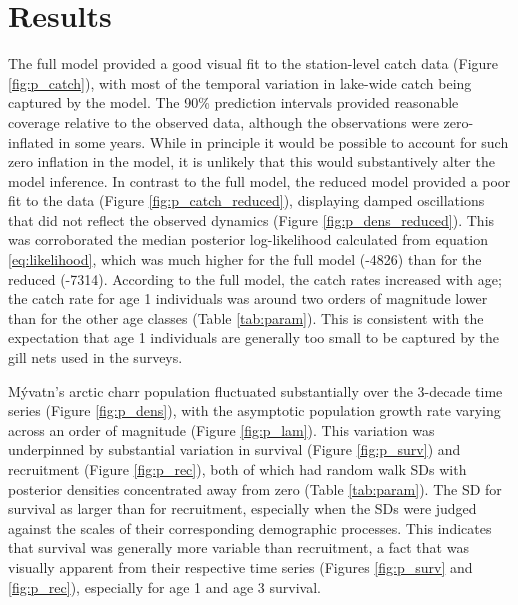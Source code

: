 \documentclass[11pt]{article}
\begin{document}
\section*{Results}

The full model provided a good visual fit to the station-level 
catch data (Figure \ref{fig:p_catch}),
with most of the temporal variation in lake-wide catch being captured by the model.
The 90\% prediction intervals provided reasonable coverage relative to the observed data,
although the observations were zero-inflated in some years.
While in principle it would be possible to account for such zero inflation in the model,
it is unlikely that this would substantively alter the model inference.
In contrast to the full model,
the reduced model provided a poor fit to the data (Figure \ref{fig:p_catch_reduced}),
displaying damped oscillations that did not reflect the observed dynamics
(Figure \ref{fig:p_dens_reduced}).
This was corroborated the median posterior log-likelihood calculated
from equation \ref{eq:likelihood},
which was much higher for the full model (-4826) than for the reduced (-7314).
According to the full model, 
the catch rates increased with age;
the catch rate for age 1 individuals was around two orders of magnitude lower
than for the other age classes (Table \ref{tab:param}). 
This is consistent with the expectation that age 1 individuals 
are generally too small to be captured by the gill nets used in the surveys.

M\'{y}vatn's arctic charr population fluctuated substantially over the 3-decade time series
(Figure \ref{fig:p_dens}), 
with the asymptotic population growth rate varying across an order of magnitude 
(Figure \ref{fig:p_lam}).
This variation was underpinned by substantial variation in survival 
(Figure \ref{fig:p_surv}) 
and recruitment (Figure \ref{fig:p_rec}),
both of which had random walk SDs 
with posterior densities concentrated away from zero (Table \ref{tab:param}).
The SD for survival as larger than for recruitment,
especially when the SDs were judged against the scales of their corresponding 
demographic processes. 
This indicates that survival was generally more variable than recruitment,
a fact that was visually apparent from their respective time series
(Figures \ref{fig:p_surv} and \ref{fig:p_rec}),
especially for age 1 and age 3 survival.
\end{document}

